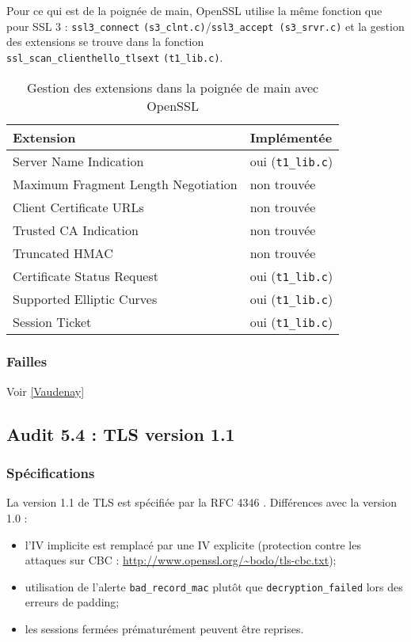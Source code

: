 Pour ce qui est de la poignée de main, OpenSSL utilise la même fonction que pour SSL 3 : \verb+ssl3_connect+ \verb+(s3_clnt.c)+/\verb+ssl3_accept (s3_srvr.c)+ et la gestion des extensions se trouve dans la fonction\\ \verb+ssl_scan_clienthello_tlsext+ \verb+(t1_lib.c)+.

\begin{table}
\centering
\begin{tabularx}{16cm}{|X|l|}
\hline
\textbf{Extension}&\textbf{Implémentée}\\ \hline
Server Name Indication& oui (\verb+t1_lib.c+)\\ \hline
Maximum Fragment Length Negotiation& non trouvée\\ \hline
Client Certificate URLs& non trouvée\\ \hline
Trusted CA Indication& non trouvée\\ \hline
Truncated HMAC & non trouvée\\ \hline
Certificate Status Request& oui (\verb+t1_lib.c+)\\ \hline
Supported Elliptic Curves& oui (\verb+t1_lib.c+)\\ \hline
Session Ticket& oui (\verb+t1_lib.c+)\\ \hline
\end{tabularx}
\caption{Gestion des extensions dans la poignée de main avec OpenSSL}
\label{extensionsOpenssl}
\end{table}


\subsubsection{Failles}
\setcounter{subsubsubsection}{0}
Voir \ref{Vaudenay}

\subsection{Audit 5.4 : TLS version 1.1}
\subsubsection{Spécifications}

La version 1.1 de TLS est spécifiée par la RFC 4346 \cite{rfc4346}. Différences avec la version 1.0 :
\begin{itemize}
\item l'IV implicite est remplacé par une IV explicite (protection contre les attaques sur CBC : \url{http://www.openssl.org/~bodo/tls-cbc.txt});
\item utilisation de l'alerte \verb+bad_record_mac+ plutôt que \verb+decryption_failed+ lors des erreurs de padding;
\item les sessions fermées prématurément peuvent être reprises.\\
\end{itemize}

